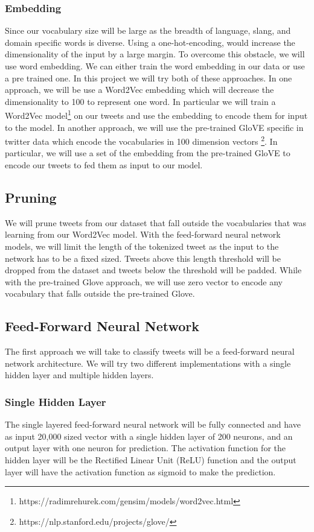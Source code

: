 \subsubsection{Embedding} Since our vocabulary size will be large as
the breadth of language, slang, and domain specific words is diverse.
Using a one-hot-encoding, would increase the dimensionality of the
input by a large margin. To overcome this obstacle, we will use word embedding. We can either train the word embedding in our data or use a pre trained one. In this project we will try both of these approaches. In one approach, we will be use a Word2Vec embedding \citep{Mikolov:2013:DRW:2999792.2999959} which will decrease the dimensionality to 100 to represent one word. In particular we will train a Word2Vec
model\footnote{https://radimrehurek.com/gensim/models/word2vec.html} on our tweets and use the embedding to encode them for input to the model. In another approach, we will use the pre-trained GloVE specific in twitter data which encode the vocabularies in 100 dimension vectors \footnote{https://nlp.stanford.edu/projects/glove/}. In particular, we will use a set of the embedding from the pre-trained GloVE to encode our tweets to fed them as input to our model. 

\subsection{Pruning} We will prune tweets from our dataset that fall
outside the vocabularies that was learning from our Word2Vec model. With
the feed-forward neural network models, we will limit the length of
the tokenized tweet as the input to the network has to be a fixed
sized. Tweets above this length threshold will be dropped from the
dataset and tweets below the threshold will be padded. While with the pre-trained Glove approach, we will use zero vector to encode any vocabulary that falls outside the pre-trained Glove. 

\subsection{Feed-Forward Neural Network} The first approach we will
take to classify tweets will be a feed-forward neural network
architecture. We will try two different implementations with a single
hidden layer and multiple hidden layers.

\subsubsection{Single Hidden Layer} The single layered feed-forward
neural network will be fully connected and have as input 20,000 sized
vector with a single hidden layer of 200 neurons, and an output
layer with one neuron for prediction. The activation function for the
hidden layer will be the Rectified Linear Unit (ReLU) function and the
output layer will have the activation function as sigmoid to make the
prediction.


